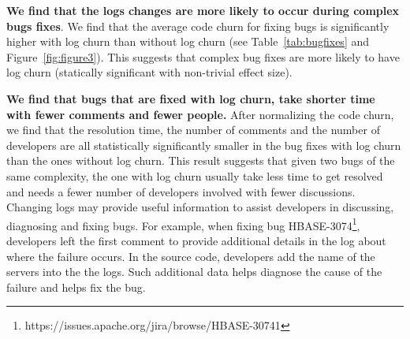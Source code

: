 \textbf{We find that the logs changes are more likely to occur during complex bugs fixes}. We find that the average code churn for fixing bugs is significantly higher with log churn than without log churn (see Table~\ref{tab:bugfixes} and Figure~\ref{fig:figure3}). This suggests that complex bug fixes are more likely to have log churn (statically significant with non-trivial effect size). 




\textbf{We find that bugs that are fixed with log churn, take shorter time with fewer comments and fewer people.} After normalizing the code churn, we find that the resolution time, the number of comments and the number of developers are all statistically significantly smaller in the bug fixes with log churn than the ones without log churn. This result suggests that given two bugs of the same complexity, the one with log churn usually take less time to get resolved and needs a fewer number of developers involved with fewer discussions. Changing logs may provide useful information to assist developers in discussing, diagnosing and fixing bugs. For example, when fixing bug HBASE-3074\footnote{https://issues.apache.org/jira/browse/HBASE-30741}, developers left the first comment to provide additional details in the log about where the failure occurs. In the source code, developers add the name of the servers into the the logs. Such additional data helps diagnose the cause of the failure and helps fix the bug.





